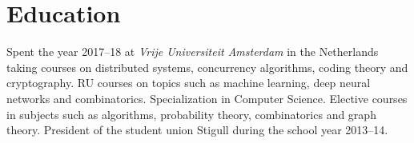 \documentclass[11pt,a4paper,sans]{moderncv}
\begin{document}
\section{Education}\label{sec:education}
{}
{Spent the year 2017--18 at \emph{Vrije Universiteit Amsterdam} in the Netherlands taking
courses on distributed systems, concurrency algorithms, coding  theory and cryptography.
RU courses on topics such as machine learning, deep neural networks and combinatorics.
}
{}
{Specialization in Computer Science. Elective courses in subjects such as
algorithms, probability theory, combinatorics and graph theory.
President of the student union Stigull during the school year 2013--14.
}

\end{document}
